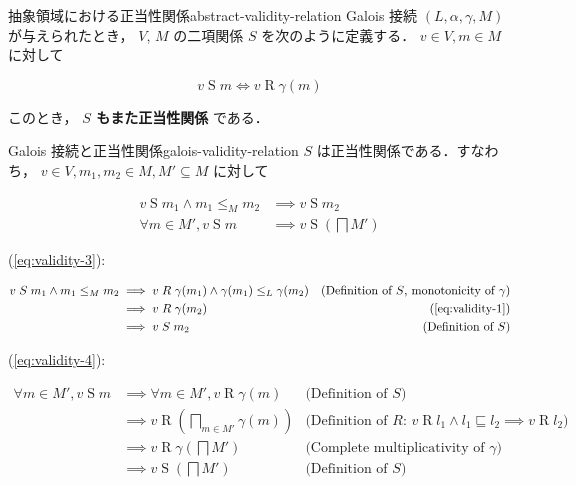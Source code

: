 \documentclass[uplatex]{jsarticle}
\begin{document}
\begin{boxdefinition}{抽象領域における正当性関係}{abstract-validity-relation}
  Galois 接続 $(L, \alpha, \gamma, M)$ が与えられたとき， $V$, $M$ の二項関係 $S$ を次のように定義する．
  $v \in V, m \in M$ に対して

  $$
    v \mathrel S m \iff v \mathrel R \gamma(m)
  $$
\end{boxdefinition}

このとき， \textbf{$S$ もまた正当性関係} である．

\begin{boxtheorem}{Galois 接続と正当性関係}{galois-validity-relation}
  $S$ は正当性関係である．すなわち，
  $v \in V, m_1, m_2 \in M, M' \subseteq M$ に対して

  \begin{align}
    v \mathrel S m_1 \land m_1 \leq_M m_2 & \implies v \mathrel S m_2 \label{eq:validity-3}                         \\
    \forall m \in M', v \mathrel S m      & \implies v \mathrel S \left( \bigsqcap M' \right) \label{eq:validity-4}
  \end{align}


\end{boxtheorem}

(\ref{eq:validity-3}):

\begin{align*}
  v \mathrel S m_1 \land m_1 \leq_M m_2 & \implies v \mathrel R \gamma(m_1) \land \gamma(m_1) \leq_L \gamma(m_2)
                                        & \text{(Definition of $S$, monotonicity of $\gamma$)}                   \\
                                        & \implies v \mathrel R \gamma(m_2)
                                        & \text{(\ref{eq:validity-1})}                                           \\
                                        & \implies v \mathrel S m_2
                                        & \text{(Definition of $S$)}
\end{align*}


(\ref{eq:validity-4}):

\begin{align*}
  \forall m \in M', v \mathrel S m & \implies \forall m \in M', v \mathrel R \gamma(m)
                                   & \text{(Definition of $S$)}                                                                         \\
                                   & \implies v \mathrel R \left( \bigsqcap_{m \in M'} \gamma(m) \right)
                                   & \text{(Definition of $R$: $v \mathrel R l_1 \land l_1 \sqsubseteq l_2 \implies v \mathrel R l_2$)} \\
                                   & \implies v \mathrel R \gamma \left( \bigsqcap M' \right)
                                   & \text{(Complete multiplicativity of $\gamma$)}                                                     \\
                                   & \implies v \mathrel S \left( \bigsqcap M' \right)
                                   & \text{(Definition of $S$)}
\end{align*}
\end{document}
